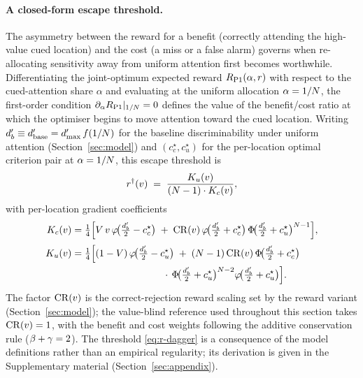 \paragraph{A closed-form escape threshold.}
The asymmetry between the reward for a benefit (correctly attending the
high-value cued location) and the cost (a miss or a false alarm) governs
when re-allocating sensitivity away from uniform attention first becomes
worthwhile. Differentiating the joint-optimum expected reward
$R_{\mathrm{P1}}(\alpha, r)$ with respect to the cued-attention share
$\alpha$ and evaluating at the uniform allocation $\alpha = 1/N$,
the first-order condition $\partial_\alpha R_{\mathrm{P1}}|_{1/N} = 0$
defines the value of the benefit/cost ratio at which the optimiser
begins to move attention toward the cued location. Writing
$d'_b \equiv d'_{\mathrm{base}} = d'_{\max}\, f(1/N)$ for
the baseline discriminability under uniform attention
(Section~\ref{sec:model}) and $(c_c^\star, c_u^\star)$ for the
per-location optimal criterion pair at $\alpha = 1/N$, this escape
threshold is
%
\begin{equation}
  r^{\dagger}(v) \;=\; \frac{K_u(v)}{(N - 1) \cdot K_c(v)},
  \label{eq:r-dagger}
\end{equation}
%
with per-location gradient coefficients
%
\begin{align}
  K_c(v) &= \tfrac{1}{4}\Big[
    V\, v\, \varphi\!\big(\tfrac{d'_b}{2} - c_c^\star\big)
    \;+\; \mathrm{CR}(v)\, \varphi\!\big(\tfrac{d'_b}{2} + c_c^\star\big)\,
    \Phi\!\big(\tfrac{d'_b}{2} + c_u^\star\big)^{N - 1}
  \Big],
  \label{eq:K-c}
  \\[2pt]
  K_u(v) &= \tfrac{1}{4}\Big[
    (1 - V)\, \varphi\!\big(\tfrac{d'_b}{2} - c_u^\star\big)
    \;+\; (N - 1)\, \mathrm{CR}(v)\, \Phi\!\big(\tfrac{d'_b}{2}
    + c_c^\star\big)
    \notag\\
    &\qquad\quad\;\;\;\;\;\;\;\;\;\;\;\;\;\;\;\;\;\;\;\;\;\;\;
    \cdot\, \Phi\!\big(\tfrac{d'_b}{2} + c_u^\star\big)^{N - 2}
    \varphi\!\big(\tfrac{d'_b}{2} + c_u^\star\big)
  \Big].
  \label{eq:K-u}
\end{align}
%
The factor $\mathrm{CR}(v)$ is the correct-rejection reward scaling set by
the reward variant (Section~\ref{sec:model}); the value-blind reference
used throughout this section takes $\mathrm{CR}(v) = 1$, with the benefit and
cost weights following the additive conservation rule
($\beta + \gamma = 2$). The threshold
\eqref{eq:r-dagger} is a consequence of the model definitions rather
than an empirical regularity; its derivation is given in the
Supplementary material (Section~\ref{sec:appendix}).


